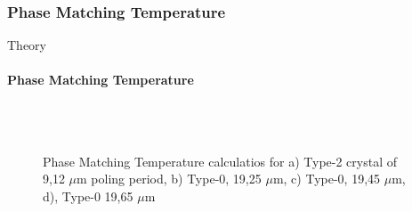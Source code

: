 \documentclass[serif,8pt]{beamer}
\begin{document}
\subsubsection{Phase Matching Temperature}
\begin{frame}{Theory}
	\framesubtitle{Phase Matching Temperature}
	\begin{figure}[!ht]
	  \centering
	  \caption{Phase Matching Temperature calculatios for a) Type-2 crystal of 9,12 $\mu$m poling period, b) Type-0, 19,25 $\mu$m, c) Type-0, 19,45 $\mu$m, d), Type-0 19,65 $\mu$m}
	  \quad
	  \\
	  \quad
	  \\
	  \label{fig:gratingstheory}
	\end{figure}
\end{frame}
\end{document}
